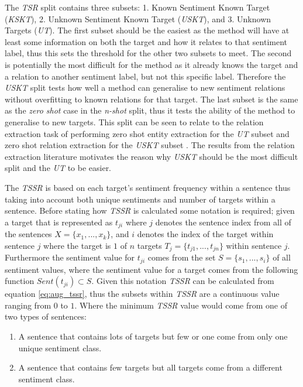 The \textit{TSR} split contains three subsets: 1. Known Sentiment Known Target (\textit{KSKT}), 2. Unknown Sentiment Known Target (\textit{USKT}), and 3. Unknown Targets (\textit{UT}). The first subset should be the easiest as the method will have at least some information on both the target and how it relates to that sentiment label, thus this sets the threshold for the other two subsets to meet. The second is potentially the most difficult for the method as it already knows the target and a relation to another sentiment label, but not this specific label. Therefore the \textit{USKT} split tests how well a method can generalise to new sentiment relations without overfitting to known relations for that target. The last subset is the same as the \textit{zero shot} case in the \textit{n-shot} split, thus it tests the ability of the method to generalise to new targets. This split can be seen to relate to the relation extraction task of performing zero shot entity extraction for the \textit{UT} subset and zero shot relation extraction for the \textit{USKT} subset \citep{levy-etal-2017-zero}. The results from the relation extraction literature \citep{levy-etal-2017-zero,abdou-etal-2019-x} motivates the reason why \textit{USKT} should be the most difficult split and the \textit{UT} to be easier.

The \textit{TSSR} is based on each target's sentiment frequency within a sentence thus taking into account both unique sentiments and number of targets within a sentence. Before stating how \textit{TSSR} is calculated some notation is required; given a target that is represented as $t_{ji}$ where $j$ denotes the sentence index from all of the sentences $X=\{x_1,...,x_k\}$, and $i$ denotes the index of the target within sentence $j$ where the target is $1$ of $n$ targets $T_j=\{t_{j1},...,t_{jn}\}$ within sentence $j$. Furthermore the sentiment value for $t_{ji}$ comes from the set $S=\{s_1,...,s_i\}$ of all sentiment values, where the sentiment value for a target comes from the following function $Sent(t_{ji})\subset S$. Given this notation \textit{TSSR} can be calculated from equation \ref{eq:aug_tssr}, thus the subsets within \textit{TSSR} are a continuous value ranging from $0$ to $1$. Where the minimum \textit{TSSR} value would come from one of two types of sentences:
\begin{enumerate}
    \item A sentence that contains lots of targets but few or one come from only one unique sentiment class.
    \item A sentence that contains few targets but all targets come from a different sentiment class.
\end{enumerate}

